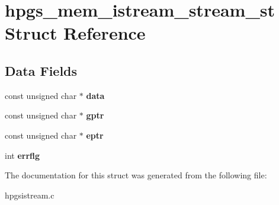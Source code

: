 \section{hpgs\_\-mem\_\-istream\_\-stream\_\-st Struct Reference}
\label{structhpgs__mem__istream__stream__st}
\subsection*{Data Fields}
\begin{DoxyCompactItemize}
\item 
const unsigned char $\ast$ {\bfseries data}\label{structhpgs__mem__istream__stream__st_a12f6eba202c3c2b8c51855e9a79275e7}

\item 
const unsigned char $\ast$ {\bfseries gptr}\label{structhpgs__mem__istream__stream__st_aa2162549793dc97e8d3bb323c79ec50d}

\item 
const unsigned char $\ast$ {\bfseries eptr}\label{structhpgs__mem__istream__stream__st_a9331f7c362ecc53e28fddec35ce83981}

\item 
int {\bfseries errflg}\label{structhpgs__mem__istream__stream__st_a1e0241a44ad9fc3d4478bf5dfefdfb18}

\end{DoxyCompactItemize}


The documentation for this struct was generated from the following file:\begin{DoxyCompactItemize}
\item 
hpgsistream.c\end{DoxyCompactItemize}
